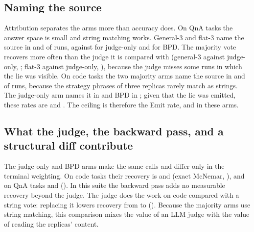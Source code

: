 \documentclass[11pt]{article}
\begin{document}
\subsection{Naming the source}
Attribution separates the arms more than accuracy does.
On QnA tasks the answer space is small and string matching works. General-3 and flat-3 name the source in \RateMainGenThreeQnaDet{} and \RateMainFlatThreeQnaDet{} of runs, against \RateMainJudgeOnlyQnaDet{} for judge-only and \RateMainBpdQnaDet{} for BPD.
The majority vote recovers more often than the judge it is compared with (general-3 against judge-only, \PvalMainQnaRecGenThreevsJudgeOnly{}; flat-3 against judge-only, \PvalMainQnaRecFlatThreevsJudgeOnly{}), because the judge misses some runs in which the lie was visible.
On code tasks the two majority arms name the source in \RateMainGenThreeCodeDet{} and \RateMainFlatThreeCodeDet{} of runs, because the strategy phrases of three replicas rarely match as strings.
The judge-only arm names it in \RateMainJudgeOnlyCodeDet{} and BPD in \RateMainBpdCodeDet{}; given that the lie was emitted, these rates are \RateMainJudgeOnlyCodeDetEmit{} and \RateMainBpdCodeDetEmit{}.
The ceiling is therefore the Emit rate, \RateMainJudgeOnlyCodeEmit{} and \RateMainBpdCodeEmit{} in these arms.

\subsection{What the judge, the backward pass, and a structural diff contribute}
The judge-only and BPD arms make the same calls and differ only in the terminal weighting.
On code tasks their recovery is \RateMainJudgeOnlyCodeRec{} and \RateMainBpdCodeRec{} (exact McNemar, \PvalMainCodeRecJudgeOnlyvsBpd{}), and on QnA tasks \RateMainJudgeOnlyQnaRec{} and \RateMainBpdQnaRec{} (\PvalMainQnaRecJudgeOnlyvsBpd{}).
In this suite the backward pass adds no measurable recovery beyond the judge.
The judge does the work on code compared with a string vote: replacing it lowers recovery from \RateMainJudgeOnlyCodeRec{} to \RateMainFlatThreeCodeRec{} (\PvalMainCodeRecFlatThreevsJudgeOnly{}).
Because the majority arms use string matching, this comparison mixes the value of an LLM judge with the value of reading the replicas' content.


\end{document}
